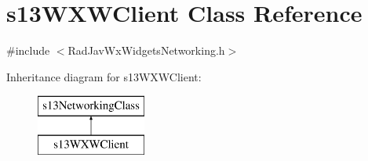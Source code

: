 \hypertarget{classs13_w_x_w_client}{}\section{s13\+W\+X\+W\+Client Class Reference}
\label{classs13_w_x_w_client}


{\ttfamily \#include $<$Rad\+Jav\+Wx\+Widgets\+Networking.\+h$>$}

Inheritance diagram for s13\+W\+X\+W\+Client\+:\begin{figure}[H]
\begin{center}
\leavevmode
\includegraphics[height=2.000000cm]{classs13_w_x_w_client}
\end{center}
\end{figure}
